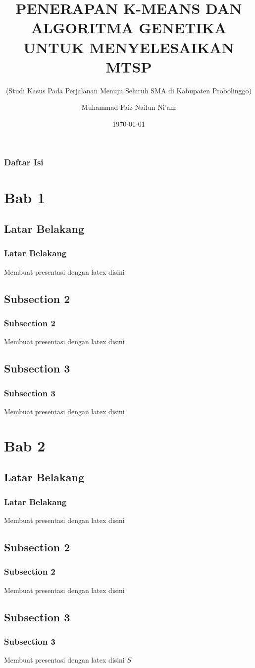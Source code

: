 \documentclass[aspectratio=169]{beamer}
\title{PENERAPAN K-MEANS DAN ALGORITMA GENETIKA UNTUK
MENYELESAIKAN MTSP}
\subtitle{(Studi Kasus Pada Perjalanan Menuju Seluruh SMA di Kabupaten Probolinggo)}
\author{Muhammad Faiz Nailun Ni'am}
\institute{Universitas Nurul Jadid}
\date{\today}
\begin{document}
\begin{frame}
\titlepage
\end{frame}

\begin{frame}
\frametitle{Daftar Isi}
\tableofcontents
\end{frame}

\section{Bab 1}
\subsection{Latar Belakang}
\begin{frame}
\frametitle{Latar Belakang}
Membuat presentasi dengan latex disini
\end{frame}

\subsection{Subsection 2}
\begin{frame}
\frametitle{Subsection 2}
Membuat presentasi dengan latex disini
\end{frame}

\subsection{Subsection 3}
\begin{frame}
\frametitle{Subsection 3}
Membuat presentasi dengan latex disini
\end{frame}

\section{Bab 2}
\subsection{Latar Belakang}
\begin{frame}
\frametitle{Latar Belakang}
Membuat presentasi dengan latex disini
\end{frame}

\subsection{Subsection 2}
\begin{frame}
\frametitle{Subsection 2}
Membuat presentasi dengan latex disini
\end{frame}

\subsection{Subsection 3}
\begin{frame}
\frametitle{Subsection 3}
Membuat presentasi dengan latex disini $S$
\end{frame}
\end{document}
